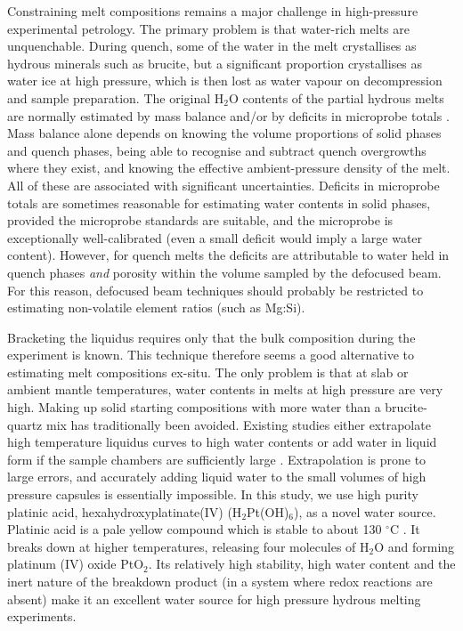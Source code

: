 \documentclass[review]{elsarticle}
\begin{document}
Constraining melt compositions remains a major challenge in high-pressure experimental petrology. The primary problem is that water-rich melts are unquenchable. During quench, some of the water in the melt crystallises as hydrous minerals such as brucite, but a significant proportion crystallises as water ice at high pressure, which is then lost as water vapour on decompression and sample preparation. The original H$_2$O contents of the partial hydrous melts are normally estimated by mass balance and/or by deficits in microprobe totals \citep[e.g.][]{OMY2000, DDFK2005, LSOK2011, MSUP2007}. Mass balance alone depends on knowing the volume proportions of solid phases and quench phases, being able to recognise and subtract quench overgrowths where they exist, and knowing the effective ambient-pressure density of the melt. All of these are associated with significant uncertainties. Deficits in microprobe totals are sometimes reasonable for estimating water contents in solid phases, provided the microprobe standards are suitable, and the microprobe is exceptionally well-calibrated (even a small deficit would imply a large water content). However, for quench melts the deficits are attributable to water held in quench phases \emph{and} porosity within the volume sampled by the defocused beam. For this reason, defocused beam techniques should probably be restricted to estimating non-volatile element ratios (such as Mg:Si).

Bracketing the liquidus requires only that the bulk composition during the experiment is known. This technique therefore seems a good alternative to estimating melt compositions ex-situ. The only problem is that at slab or ambient mantle temperatures, water contents in melts at high pressure are very high. Making up solid starting compositions with more water than a brucite-quartz mix has traditionally been avoided. Existing studies either extrapolate high temperature liquidus curves to high water contents or add water in liquid form if the sample chambers are sufficiently large \citep[e.g.][]{HM2012}. Extrapolation is prone to large errors, and accurately adding liquid water to the small volumes of high pressure capsules is essentially impossible. In this study, we use high purity platinic acid, hexahydroxyplatinate(IV) (H$_2$Pt(OH)$_6$), as a novel water source. Platinic acid is a pale yellow compound which is stable to about 130 $^{\circ}$C \citep{Nagano2002}. It breaks down at higher temperatures, releasing four molecules of H$_2$O and forming platinum (IV) oxide PtO$_2$. Its relatively high stability, high water content and the inert nature of the breakdown product (in a system where redox reactions are absent) make it an excellent water source for high pressure hydrous melting experiments.
\end{document}

